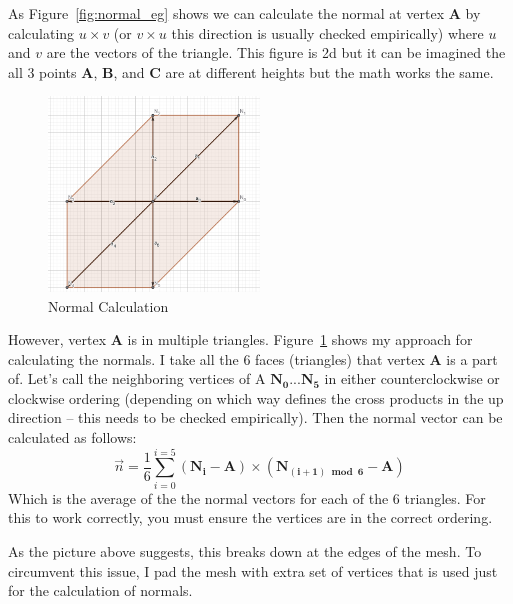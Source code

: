 As Figure~\ref{fig:normal_eg} shows we can calculate the normal at vertex \textbf{A} by calculating $u \times v$ (or $v \times u$ this direction is usually checked empirically) where $u$ and $v$ are the vectors of the triangle. This figure is 2d but it can be imagined the all 3 points \textbf{A}, \textbf{B}, and \textbf{C} are at different heights but the math works the same. 

\begin{figure}[H]
    \centering
    \includegraphics[width=0.5\textwidth]{images/normal_calc.png}
    \caption{Normal Calculation}
    \label{fig:normal_calc}
\end{figure}


However, vertex \textbf{A} is in multiple triangles. Figure~\ref{fig:normal_calc} shows my approach for calculating the normals. I take all the 6 faces (triangles) that vertex \textbf{A} is a part of. Let's call the neighboring vertices of A $\mathbf{N_0}...\mathbf{N_5}$ in either counterclockwise or clockwise ordering (depending on which way defines the cross products in the up direction -- this needs to be checked empirically). Then the normal vector can be calculated as follows:
\[
\vec{n} = \frac{1}{6}\sum_{i=0}^{i=5}{(\mathbf{N_i}-\mathbf{A}) \times (\mathbf{N_{(i+1) \bmod 6}} - \mathbf{A})}
\]
Which is the average of the the normal vectors for each of the 6 triangles. For this to work correctly, you must ensure the vertices are in the correct ordering.

As the picture above suggests, this breaks down at the edges of the mesh. To circumvent this issue, I pad the mesh with extra set of vertices that is used just for the calculation of normals.

